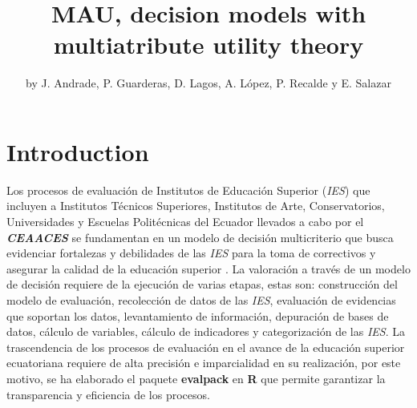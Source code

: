 \title{MAU, decision models with multiatribute utility theory}
\author{by J. Andrade, P. Guarderas, D. Lagos, A. López, P. Recalde y E. Salazar }

\maketitle


\section{Introduction}


Los procesos de evaluación de Institutos de Educación Superior ({\it IES}) que incluyen a Institutos
Técnicos Superiores, Institutos de Arte, Conservatorios, Universidades y Escuelas Politécnicas del
Ecuador llevados a cabo por el \textit{\textbf{CEAACES}} se fundamentan en un modelo de decisión
multicriterio que busca evidenciar fortalezas y debilidades de las {\it IES} para la toma de
correctivos y asegurar la calidad de la educación superior \citep{1}. La valoración a través de un
modelo de decisión requiere de la ejecución de varias etapas, estas son: construcción del modelo de
evaluación, recolección de datos de las {\it IES}, evaluación de evidencias que soportan los datos,
levantamiento de información, depuración de bases de datos, cálculo de variables, cálculo de
indicadores y categorización de las {\it IES}. La trascendencia de los procesos de evaluación en el
avance de la educación superior ecuatoriana requiere de alta precisión e imparcialidad en su
realización, por este motivo, se ha elaborado el paquete \textbf{evalpack} en {\bf R } que
permite garantizar la transparencia y eficiencia de los procesos.    


